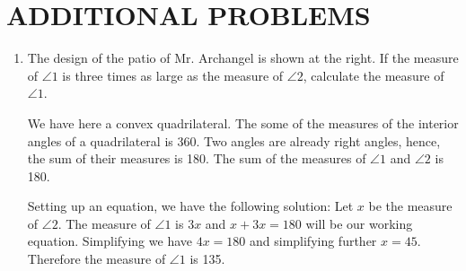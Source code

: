 \section*{ADDITIONAL PROBLEMS}
\begin{enumerate}
\item The design of the patio of Mr. Archangel is shown at the right. If the measure of $\angle1$ is three times as large as the measure of $\angle 2$, calculate the measure of $\angle 1$.
\begin{center}
\end{center}
\Solution

We have here a convex quadrilateral. The some of the measures of
the interior angles of a quadrilateral is 360. Two angles are already
right angles, hence, the sum of their measures is 180. The sum of the
measures of $\angle 1$ and $\angle 2$ is 180.

Setting up an equation, we have the following solution:
Let $x$ be the measure of $\angle 2$. The measure of $\angle 1$ is $3x$ and $x+3x=180$
will be our working equation. Simplifying we have $4x=180$ and simplifying further $x = 45$. Therefore the measure of $\angle 1$ is 135.


\end{enumerate}
